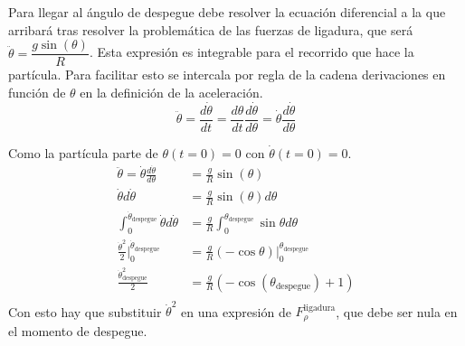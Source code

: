 \documentclass[11pt, spanish, a4paper, twoside]{article}
\begin{document}
\begin{enumerate}
	Para llegar al ángulo de despegue debe resolver la ecuación diferencial a la que arribará tras resolver la problemática de las fuerzas de ligadura, que será $\ddot{\theta} = \dfrac{g \sin(\theta)}{R}$.
	Esta expresión es integrable para el recorrido que hace la partícula.
	Para facilitar esto se intercala por regla de la cadena derivaciones en función de \(\theta\) en la definición de la aceleración.
	$$
		\ddot{\theta} 
		= \frac{d \dot{\theta} }{d t} 
		= \frac{d \theta}{d t} \frac{d \dot{\theta}}{d \theta} 
		= \dot{\theta} \frac{d \dot{\theta}}{d \theta}
	$$

	Como la partícula parte de $\theta(t=0) = 0$ con $\dot{\theta}(t=0) = 0$.
	$$
	\begin{aligned}
		\ddot{\theta} = \dot{\theta} \frac{d \dot{\theta}}{d \theta}
		&= \frac{g}{R} \sin(\theta)\\
		\dot{\theta} d \dot{\theta}
		&= \frac{g}{R} \sin(\theta) d \theta \\
		\int_0^{\dot{\theta}_\mathrm{despegue}} \dot{\theta} d \dot{\theta}
		&= \frac{g}{R} \int_0^{\theta_\mathrm{despegue}} \sin{\theta} d \theta\\
		\frac{\dot{\theta}^2}{2} \bigg|_0^{\dot{\theta}_\mathrm{despegue}}
		&= \frac{g}{R} (-\cos{\theta}) \bigg|_0^{\theta_\mathrm{despegue}}\\
		\frac{\dot{\theta}_\mathrm{despegue}^2}{2}
		&= \frac{g}{R} (-\cos(\theta_\mathrm{despegue}) + 1)\\
	\end{aligned}
	$$
	Con esto hay que substituir $\dot{\theta}^2$ en una expresión de $F^\mathrm{ligadura}_{\rho}$, que debe ser nula en el momento de despegue.


\end{enumerate}
\end{document}
